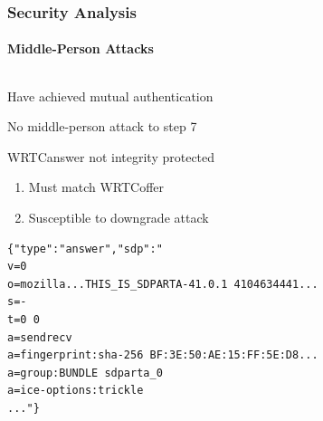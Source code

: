\documentclass[handout, notes=show]{beamer}
\begin{document}


\begin{frame}[fragile]
\frametitle{Security Analysis}
\framesubtitle{Middle-Person Attacks}

\begin{columns}[T]
\begin{column}[T]{0.6\textwidth}
\setlength{\parskip}{0.5em}
Have achieved mutual authentication

No middle-person attack to step 7

WRTCanswer not integrity protected
\begin{enumerate}
\item Must match WRTCoffer
\item Susceptible to downgrade attack
\end{enumerate}
\setlength{\fboxrule}{10.0em}
\begin{snugshade}
\begin{tiny}
\begin{verbatim}{"type":"answer","sdp":"
v=0
o=mozilla...THIS_IS_SDPARTA-41.0.1 4104634441...
s=-
t=0 0
a=sendrecv
a=fingerprint:sha-256 BF:3E:50:AE:15:FF:5E:D8...
a=group:BUNDLE sdparta_0
a=ice-options:trickle
..."}
\end{verbatim}
\end{tiny}
\end{snugshade}


\end{column}
\end{columns}
\end{frame}
\end{document}

